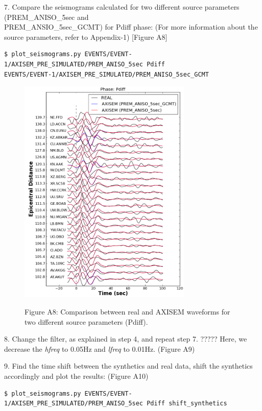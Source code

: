 \documentclass{article}
\begin{document}
7. Compare the seismograms calculated for two different source parameters (PREM\_ANISO\_5sec and \\
PREM\_ANSIO\_5sec\_GCMT) for Pdiff phase: (For more information about the source 
parameters, refer to Appendix-1) [Figure A8]

\begin{verbatim}
$ plot_seismograms.py EVENTS/EVENT-1/AXISEM_PRE_SIMULATED/PREM_ANISO_5sec Pdiff 
EVENTS/EVENT-1/AXISEM_PRE_SIMULATED/PREM_ANISO_5sec_GCMT
\end{verbatim}

\begin{figure}
\centering
\includegraphics[width=234pt, height=310pt, keepaspectratio=true]{AXISEMTutorial-fig014.png}
\begin{center}
{\small{}Figure A8: Comparison between real and AXISEM waveforms for two different 
source parameters (Pdiff).}
\end{center}
\end{figure}

8. Change the filter, as explained in step 4, and repeat step 7. ????? Here, we decrease 
the \textit{hfreq} to 0.05Hz and \textit{lfreq} to 0.01Hz. (Figure A9)

9. Find the time shift between the synthetics and real data, shift the synthetics 
accordingly and plot the results: (Figure A10)

\begin{verbatim}
$ plot_seismograms.py EVENTS/EVENT-1/AXISEM_PRE_SIMULATED/PREM_ANISO_5sec Pdiff shift_synthetics
\end{verbatim}
\end{document}
